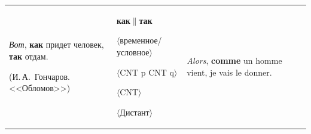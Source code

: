 \begin{table}\small %


\begin{center}




\vspace*{2ex}








\tabcolsep=7.5pt


\begin{tabular}{|p{44mm}|p{32mm}|p{45mm}|p{24mm}|}


\hline


\textit{Вот}, \textbf{как} придет человек, \textbf{так} отдам.\newline


\newline


\newline


\newline


\newline


\newline


\newline


(И.\,А.~Гончаров. <<Обломов>>)&\textbf{как}$\|$\textbf{так}\newline


$\langle$временное/условное$\rangle$\newline


$\langle$CNT p CNT q$\rangle$\newline


$\langle$CNT$\rangle$\newline 


$\langle$Дистант$\rangle$


&\textit{Alors}, \textbf{comme} un homme vient, je vais le donner.\newline


\newline


\newline


\newline


\newline



\end{tabular}
\end{center}
\end{table}
